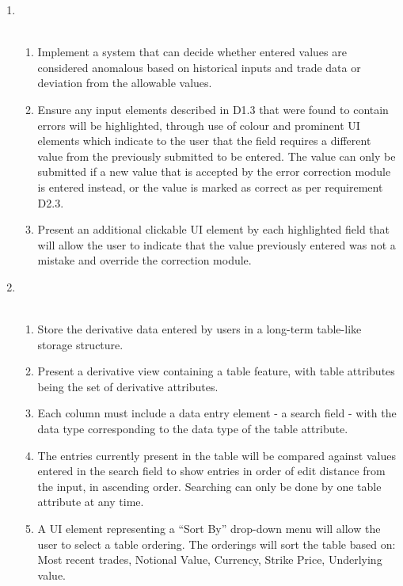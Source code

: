 \documentclass[8pt]{extarticle}
\begin{document}
\begin{enumerate}[label=C\arabic*]
\item \\\
\begin{enumerate}[label=D2.\arabic*]
\item Implement a system that can decide whether entered values are considered anomalous based on historical inputs and trade data or deviation from the allowable values. 

\item Ensure any input elements described in D1.3 that were found to contain errors will be highlighted, through use of colour and prominent UI elements which indicate to the user that the field requires a different value from the previously submitted to be entered.  The value can only be submitted if a new value that is accepted by the error correction module is entered instead, or the value is marked as correct as per requirement D2.3. 

\item Present an additional clickable UI element by each highlighted field that will allow the user to indicate that the value previously entered was not a mistake and override the correction module. 
\end{enumerate}

\item \\\
\begin{enumerate}[label=D3.\arabic*]
\item Store the derivative data entered by users in a long-term table-like storage structure. 

\item Present a derivative view containing a table feature, with table attributes being the set of derivative attributes. 

\item Each column must include a data entry element - a search field - with the data type corresponding to the data type of the table attribute. 

\item The entries currently present in the table will be compared against values entered in the search field to show entries in order of edit distance from the input, in ascending order. Searching can only be done by one table attribute at any time. 

\item A UI element representing a “Sort By” drop-down menu will allow the user to select a table ordering. The orderings will sort the table based on: Most recent trades, Notional Value, Currency, Strike Price, Underlying value. 
\end{enumerate}


\end{enumerate}
\end{document}

